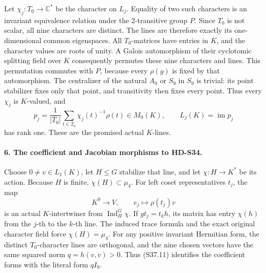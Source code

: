 Let \(\chi_j:T_0\to\mathbb C^*\) be the character on
\(L_j\). Equality of two such characters is an invariant
equivalence relation under the 2-transitive group \(P\).
Since \(T_0\) is not scalar, all nine characters are distinct.
The lines are therefore exactly its one-dimensional common
eigenspaces. All \(T_0\)-matrices have entries in \(K\),
and the character values are roots of unity. A Galois automorphism
of their cyclotomic splitting field over \(K\) consequently
permutes these nine characters and lines. This permutation
commutes with \(P\), because every \(\rho(g)\) is fixed
by that automorphism. The centralizer of the natural \(A_9\)
or \(S_9\) in \(S_9\) is trivial: its point stabilizer
fixes only that point, and transitivity then fixes every point.
Thus every \(\chi_j\) is \(K\)-valued, and
\[
        p_j=\frac1{|T_0|}\sum_{t\in T_0}\chi_j(t)^{-1}\rho(t)
            \in M_9(K),\qquad L_j(K)=\operatorname{im}p_j     \tag{S37.10}
\]
has rank one. These are the promised actual \(K\)-lines.

\paragraph{6. The coefficient and Jacobian morphisms to HD-S34.}
Choose \(0\ne v\in L_1(K)\), let \(H\le G\) stabilize
that line, and let \(\chi:H\to K^*\) be its action.
Because \(H\) is finite, \(\chi(H)\subset\mu_4\).
For left coset representatives \(t_j\), the map
\[
     K^9\longrightarrow V,\qquad e_j\longmapsto\rho(t_j)v
                                                               \tag{S37.11}
\]
is an actual \(K\)-intertwiner from \(\operatorname{Ind}_H^G\chi\).
If \(gt_j=t_kh\), its matrix has entry \(\chi(h)\)
from the \(j\)-th to the \(k\)-th line. The induced trace
formula and the exact original character field force
\(\chi(H)=\mu_4\). For any positive invariant Hermitian
form, the distinct \(T_0\)-character lines are orthogonal,
and the nine chosen vectors have the same squared norm
\(q=h(v,v)>0\). Thus (S37.11) identifies the coefficient
forms with the literal form \(qI_9\).

